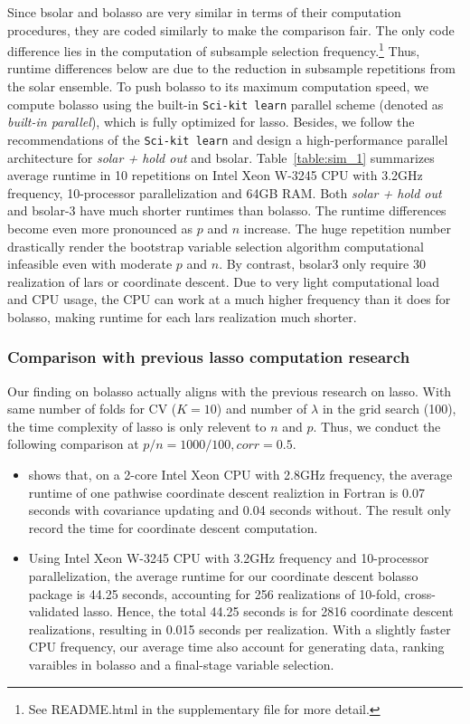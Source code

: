 \documentclass[12pt]{article}
\begin{document}
Since bsolar and bolasso are very similar in terms of their computation procedures, they are coded similarly to make the comparison fair. The only code difference lies in the computation of subsample selection frequency.\footnote{See README.html in the supplementary file for more detail.} Thus, runtime differences below are due to the reduction in subsample repetitions from the solar ensemble. To push bolasso to its maximum computation speed, we compute bolasso using the built-in \texttt{Sci-kit learn} parallel scheme (denoted as \emph{built-in parallel}), which is fully optimized for lasso. Besides, we follow the recommendations of the \texttt{Sci-kit learn} and design a high-performance parallel architecture for \emph{solar + hold out} and bsolar. Table~\ref{table:sim_1} summarizes average runtime in 10 repetitions on Intel Xeon W-3245 CPU with 3.2GHz frequency, 10-processor parallelization and 64GB RAM. Both \emph{solar + hold out} and bsolar-3 have much shorter runtimes than bolasso. The runtime differences become even more pronounced as $p$ and $n$ increase. The huge repetition number drastically render the bootstrap variable selection algorithm computational infeasible even with moderate $p$ and $n$. By contrast, bsolar3 only require 30 realization of lars or coordinate descent. Due to very light computational load and CPU usage, the CPU can work at a much higher frequency than it does for bolasso, making runtime for each lars realization much shorter.

\subsubsection{Comparison with previous lasso computation research}

Our finding on bolasso actually aligns with the previous research on lasso. With same number of folds for CV ($K=10$) and number of $\lambda$ in the grid search (100), the time complexity of lasso is only relevent to $n$ and $p$. Thus, we conduct the following comparison at $p/n=1000/100, corr=0.5$.

\begin{itemize}
  \item \citet[Table 1]{friedman2010regularization} shows that, on a 2-core Intel Xeon CPU with 2.8GHz frequency, the average runtime of one pathwise coordinate descent realiztion in Fortran is 0.07 seconds with covariance updating and 0.04 seconds without. The \citet{friedman2010regularization} result only record the time for coordinate descent computation.
  \item Using Intel Xeon W-3245 CPU with 3.2GHz frequency and 10-processor parallelization, the average runtime for our coordinate descent bolasso package is 44.25 seconds, accounting for 256 realizations of 10-fold, cross-validated lasso. Hence, the total 44.25 seconds is for 2816 coordinate descent realizations, resulting in 0.015 seconds per realization. With a slightly faster CPU frequency, our average time also account for generating data, ranking varaibles in bolasso and a final-stage variable selection.
\end{itemize}
\end{document}
